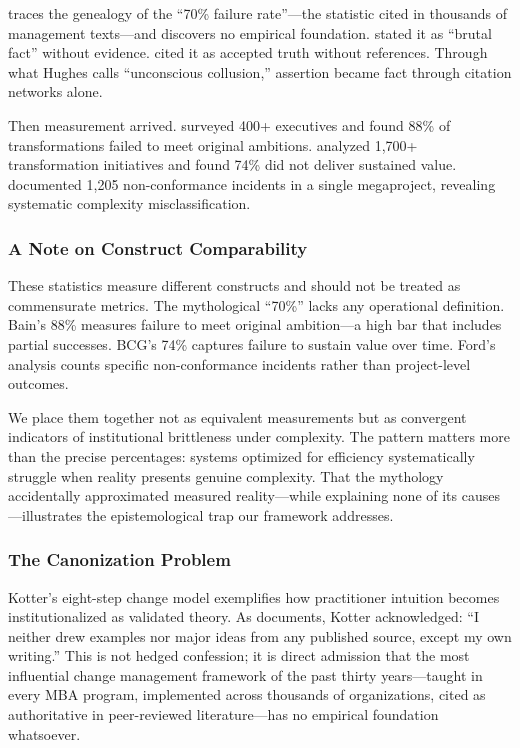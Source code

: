 \citet{hughes2011} traces the genealogy of the ``70\% failure rate''—the statistic cited in thousands of management texts—and discovers no empirical foundation. \citet{beer2000} stated it as ``brutal fact'' without evidence. \citet{kotter2008} cited it as accepted truth without references. Through what Hughes calls ``unconscious collusion,'' assertion became fact through citation networks alone.

Then measurement arrived. \citet{bain2024} surveyed 400+ executives and found 88\% of transformations failed to meet original ambitions. \citet{bcg2024} analyzed 1,700+ transformation initiatives and found 74\% did not deliver sustained value. \citet{ford2024} documented 1,205 non-conformance incidents in a single megaproject, revealing systematic complexity misclassification.

\subsubsection{A Note on Construct Comparability}

These statistics measure different constructs and should not be treated as commensurate metrics. The mythological ``70\%'' lacks any operational definition. Bain's 88\% measures failure to meet original ambition—a high bar that includes partial successes. BCG's 74\% captures failure to sustain value over time. Ford's analysis counts specific non-conformance incidents rather than project-level outcomes.

We place them together not as equivalent measurements but as convergent indicators of institutional brittleness under complexity. The pattern matters more than the precise percentages: systems optimized for efficiency systematically struggle when reality presents genuine complexity. That the mythology accidentally approximated measured reality—while explaining none of its causes—illustrates the epistemological trap our framework addresses.

\subsubsection{The Canonization Problem}

Kotter's eight-step change model exemplifies how practitioner intuition becomes institutionalized as validated theory. As \citet{hughes2015} documents, Kotter acknowledged: ``I neither drew examples nor major ideas from any published source, except my own writing.'' This is not hedged confession; it is direct admission that the most influential change management framework of the past thirty years—taught in every MBA program, implemented across thousands of organizations, cited as authoritative in peer-reviewed literature—has no empirical foundation whatsoever.


